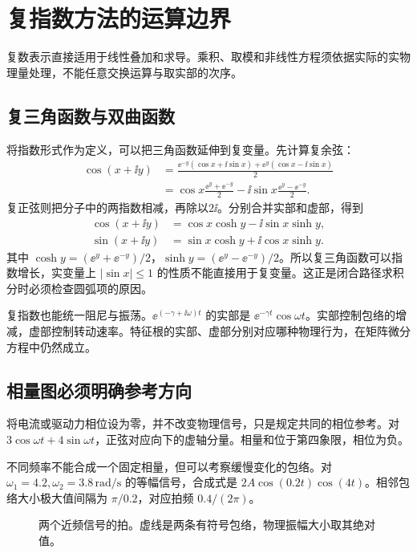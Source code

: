 \documentclass[11pt,openany,fontset=fandol]{ctexbook}
\theoremstyle{plain}\newtheorem{theorem}{定理}[chapter]\newtheorem{proposition}[theorem]{命题}
\theoremstyle{definition}\newtheorem{definition}{定义}[chapter]\newtheorem{example}{例}[chapter]
\theoremstyle{remark}\newtheorem*{remark}{说明}
\begin{document}
\section{复指数方法的运算边界}
复数表示直接适用于线性叠加和求导。乘积、取模和非线性方程须依据实际的实物理量处理，不能任意交换运算与取实部的次序。

\subsection{复三角函数与双曲函数}
将指数形式作为定义，可以把三角函数延伸到复变量。先计算复余弦：
\begin{align*}
\cos(x+\ii y)
&=\frac{\ee^{-y}(\cos x+\ii\sin x)
+\ee^y(\cos x-\ii\sin x)}2\\
&=\cos x\frac{\ee^y+\ee^{-y}}2
-\ii\sin x\frac{\ee^y-\ee^{-y}}2.
\end{align*}
复正弦则把分子中的两指数相减，再除以$2\ii$。分别合并实部和虚部，得到
\begin{align}
\cos(x+\ii y)&=\cos x\cosh y-\ii\sin x\sinh y,\\
\sin(x+\ii y)&=\sin x\cosh y+\ii\cos x\sinh y.
\end{align}
其中 $\cosh y=(\ee^y+\ee^{-y})/2$，$\sinh y=(\ee^y-\ee^{-y})/2$。所以复三角函数可以指数增长，实变量上 $|\sin x|\le1$ 的性质不能直接用于复变量。这正是闭合路径求积分时必须检查圆弧项的原因。

复指数也能统一阻尼与振荡。$\ee^{(-\gamma+\ii\omega)t}$ 的实部是 $\ee^{-\gamma t}\cos\omega t$。实部控制包络的增减，虚部控制转动速率。特征根的实部、虚部分别对应哪种物理行为，在矩阵微分方程中仍然成立。

\subsection{相量图必须明确参考方向}
将电流或驱动力相位设为零，并不改变物理信号，只是规定共同的相位参考。对 $3\cos\omega t+4\sin\omega t$，正弦对应向下的虚轴分量。相量和位于第四象限，相位为负。

不同频率不能合成一个固定相量，但可以考察缓慢变化的包络。对 $\omega_1=4.2,\omega_2=3.8\,\mathrm{rad/s}$ 的等幅信号，合成式是 $2A\cos(0.2t)\cos(4t)$。相邻包络大小极大值间隔为 $\pi/0.2$，对应拍频 $0.4/(2\pi)$。
\begin{figure}[htbp]\centering
{}
\caption{两个近频信号的拍。虚线是两条有符号包络，物理振幅大小取其绝对值。}
\label{fig:orig-004}
\end{figure}
\end{document}
